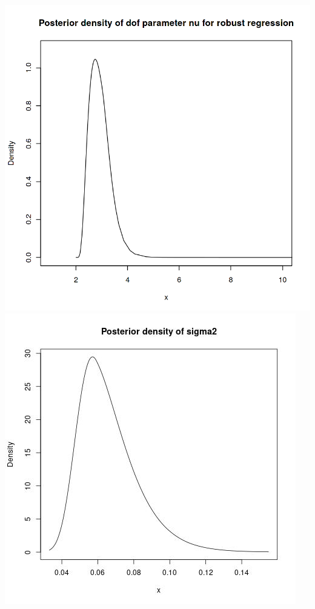 \documentclass[12pt,a4paper]{article}
\begin{document}
\begin{enumerate}[(a)]
\includegraphics[scale=0.25]{./images/2_Figure2_df.png}
\includegraphics[scale=0.440]{./images/posterior.jpg}


\end{enumerate}
\end{document}
